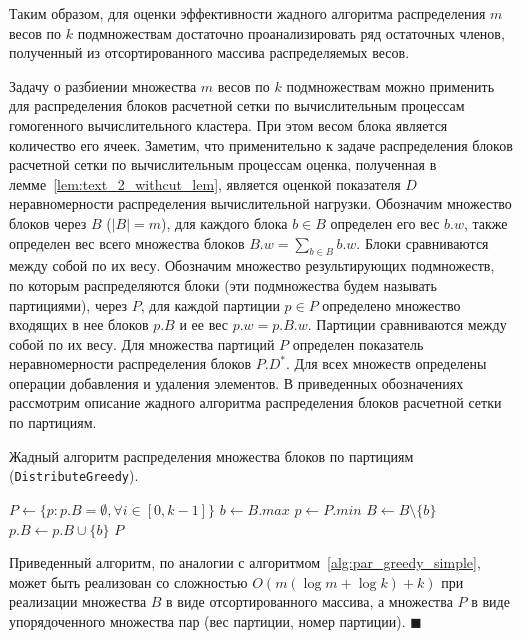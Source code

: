 Таким образом, для оценки эффективности жадного алгоритма распределения $m$ весов по $k$ подмножествам достаточно проанализировать ряд остаточных членов, полученный из отсортированного массива распределяемых весов.

Задачу о разбиении множества $m$ весов по $k$ подмножествам можно применить для распределения блоков расчетной сетки по вычислительным процессам гомогенного вычислительного кластера.
При этом весом блока является количество его ячеек.
Заметим, что применительно к задаче распределения блоков расчетной сетки по вычислительным процессам оценка, полученная в лемме~\ref{lem:text_2_withcut_lem}, является оценкой показателя $D$ неравномерности распределения вычислительной нагрузки.
Обозначим множество блоков через $B$ ($|B| = m$), для каждого блока $b \in B$ определен его вес $b.w$, также определен вес всего множества блоков $B.w = \sum_{b \in B}{b.w}$.
Блоки сравниваются между собой по их весу.
Обозначим множество результирующих подмножеств, по которым распределяются блоки (эти подмножества будем называть партициями), через $P$, для каждой партиции $p \in P$ определено множество входящих в нее блоков $p.B$ и ее вес $p.w = p.B.w$.
Партиции сравниваются между собой по их весу.
Для множества партиций $P$ определен показатель неравномерности распределения блоков $P.D^{*}$.
Для всех множеств определены операции добавления и удаления элементов.
В приведенных обозначениях рассмотрим описание жадного алгоритма распределения блоков расчетной сетки по партициям.

\begin{algo}\label{alg:par_distr_greedy}
Жадный алгоритм распределения множества блоков по партициям (\texttt{DistributeGreedy}).
\begin{algorithm}
\DontPrintSemicolon
{}
{
$P \leftarrow \{ p : p.B = \emptyset, \forall i \in [0, k - 1] \}$\;
{
	$b \leftarrow B.max$\;
	$p \leftarrow P.min$\;
	$B \leftarrow B \setminus \{ b \}$\;
	$p.B \leftarrow p.B \cup \{ b \}$\;
}
\KwRet $P$\;
}
\end{algorithm}
\end{algo}

Приведенный алгоритм, по аналогии с алгоритмом~\ref{alg:par_greedy_simple}, может быть реализован со сложностью $O(m(\log m + \log k) + k)$ при реализации множества $B$ в виде отсортированного массива, а множества $P$ в виде упорядоченного множества пар (вес партиции, номер партиции).
$\blacksquare$\\

